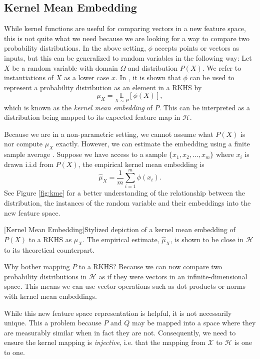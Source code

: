 \subsection{Kernel Mean Embedding}
\label{kernel_mean_emb}
While kernel functions are useful for comparing vectors in a new feature space, this is not quite what we need because we are looking for a way to compare two probability distributions. In the above setting, $\phi$ accepts points or vectors as inputs, but this can be generalized to random variables in the following way: Let $X$ be a random variable with domain $\Omega$ and distribution $P(X)$. We refer to instantiations of $X$ as a lower case $x$. In \cite{smola2007hilbert}, it is shown that $\phi$ can be used to represent a probability distribution as an element in a RKHS by
\begin{equation}
\mu_X =\underset{X \sim P} {\mathbb{E}}[\phi(X)],
\end{equation}
which is known as the \textit{kernel mean embedding} of $P$. This can be interpreted as a  distribution being mapped to its expected feature map in $\mathcal{H}$. 

Because we are in a non-parametric setting, we cannot assume what $P(X)$ is nor compute $\mu_X$ exactly. However, we can estimate the embedding using a finite sample average  \cite{smola2007hilbert}. Suppose we have access to a sample $\{x_1, x_2, ..., x_m\}$ where $x_i$ is drawn i.i.d from $P(X)$, the empirical kernel mean embedding is 
\begin{equation}
\hat{\mu}_X = \frac{1}{m} \sum_{i=1}^m \phi(x_i).
\end{equation}
See Figure \ref{fig:kme} for a better understanding of the relationship between the distribution, the instances of the random variable and their embeddings into the new feature space.
\begin{center} 
[Kernel Mean Embedding]{Stylized depiction of a kernel mean embedding of $P(X)$ to a RKHS as $\mu_X$. The empirical estimate, $\hat{\mu}_X$, is shown to be close in $\mathcal{H}$ to its theoretical counterpart.} 
\label{fig:kme} 
\end{center}

Why bother mapping $P$ to a RKHS? Because we can now compare two probability distributions in $\mathcal{H}$ as if they were vectors in an infinite-dimensional space. This means we can use vector operations such as dot products or norms with kernel mean embeddings.

While this new feature space representation is helpful, it is not necessarily unique. This a problem because $P$ and $Q$ may be mapped into a space where they are measurably similar when in fact they are not. Consequently, we need to ensure the kernel mapping is \textit{injective}, i.e. that the mapping from $\mathcal{X}$ to  $\mathcal{H}$ is one to one. %

